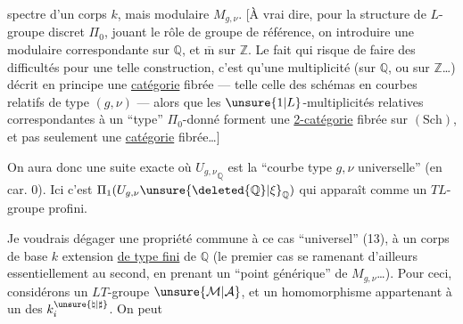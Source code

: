 spectre d'un corps $k$, mais    modulaire $M_{g,\nu}$. [À vrai dire, pour la structure de $L$-groupe discret $\Pi_0$, jouant le rôle de groupe de référence, on   introduire une   modulaire correspondante sur $\mathbb{Q}$, et $\overline{\mathrm m}$ sur $\mathbb{Z}$. Le fait qui risque de faire des difficultés  pour une telle construction, c'est qu'une multiplicité  (sur $\mathbb{Q}$, ou sur $\mathbb{Z}$\ldots) décrit en principe une \uline{catégorie} fibrée --- telle celle des schémas en courbes relatifs de type $(g,\nu)$ --- alors que les $\unsure{1|L}$-multiplicités relatives correspondantes à un ``type'' $\Pi_0$-donné forment une \uline{2-catégorie}  fibrée sur $(\mathrm{Sch})$, et pas seulement une \uline{catégorie} fibrée\ldots]


On aura donc une suite exacte
où ${U_{g,\nu}}_{\mathbb{Q}}$ est la ``courbe  type $g,\nu$ universelle'' (en car. $0$). Ici c'est $\Pi_1(U_{g,\nu}\unsure{\deleted{\mathbb{Q}}|\xi}_{\mathbb{Q}})$ qui apparaît comme un $TL$-groupe profini.

Je voudrais dégager une propriété commune à ce cas ``universel'' (13),    à un corps de base $k$ extension \uline{de type fini} de $\mathbb{Q}$ (le premier cas se ramenant d'ailleurs essentiellement au second, en prenant un ``point générique'' de $M_{g,\nu}$\ldots). Pour ceci, considérons un $LT$-groupe $\unsure{\mathcal{M}|\mathcal{A}}$, et un  homomorphisme
appartenant à un des $k_i^{\unsure{\natural|\sharp}}$. On peut

